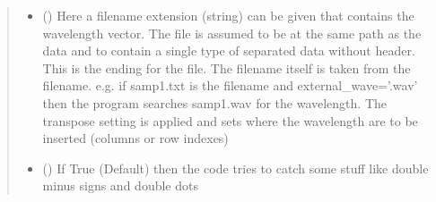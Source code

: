 \documentclass[letterpaper,10pt,english]{sphinxmanual}
\begin{document}
\begin{fulllineitems}
\begin{fulllineitems}
\begin{quote}
\begin{description}
\begin{itemize}
\item {} 
 (\sphinxstyleliteralemphasis{\sphinxupquote{ (}}\sphinxstyleliteralemphasis{\sphinxupquote{)}}) \textendash{} Here a filename extension (string) can be given that contains the wavelength vector.
The file is assumed to be at the same path as the data and to contain a single type
of separated data without header. This is the ending for the file. The filename itself
is taken from the filename. e.g. if samp1.txt is the filename and external\_wave=’.wav’
then the program searches samp1.wav for the wavelength. The transpose setting is applied
and sets where the wavelength are to be inserted (columns or row indexes)

\item {} 
 (\sphinxstyleliteralemphasis{\sphinxupquote{ (}}\sphinxstyleliteralemphasis{\sphinxupquote{)}}) \textendash{} If True (Default) then the code tries to catch some stuff like double minus signs and double dots

\end{itemize}

\end{description}\end{quote}

\end{fulllineitems}


\end{fulllineitems}

\label{\detokenize{plot_func:module-plot_func}}
\end{document}
